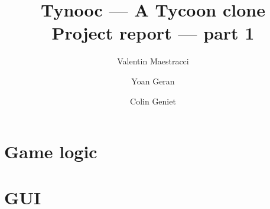 \documentclass{article}
\begin{document}
\title{Tynooc --- A Tycoon clone \\ \large{Project report --- part 1}}
\author{Valentin Maestracci \and Yoan Geran \and Colin Geniet}
\maketitle

\tableofcontents

\section{Game logic}

\section{GUI}
\end{document}
